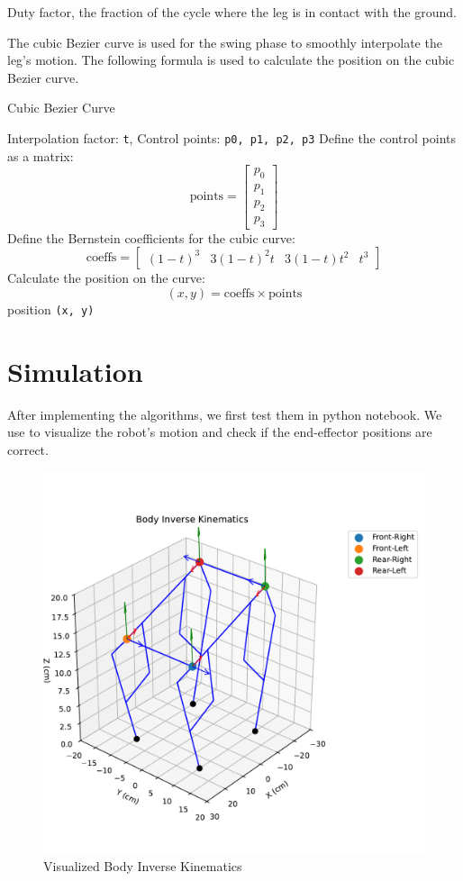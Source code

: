 \documentclass[a4paper,11pt]{article}
\begin{document}
Duty factor, the fraction of the cycle where the leg is in contact with the ground.

The cubic Bezier curve is used for the swing phase to smoothly interpolate the leg's motion. The following formula is used to calculate the position on the cubic Bezier curve.

\begin{algorithm}[H]
	\caption{Cubic Bezier Curve}
	\begin{algorithmic}[1]
		\Require Interpolation factor: \texttt{t}, Control points: \texttt{p0, p1, p2, p3}
		\State Define the control points as a matrix:
		$$
			\text{points} = \begin{bmatrix} p_0 \\ p_1 \\ p_2 \\ p_3 \end{bmatrix}
		$$
		\State Define the Bernstein coefficients for the cubic curve:
		$$
			\text{coeffs} = \begin{bmatrix} (1-t)^3 & 3(1-t)^2t & 3(1-t)t^2 & t^3 \end{bmatrix}
		$$
		\State Calculate the position on the curve:
		$$
			(x, y) = \text{coeffs} \times \text{points}
		$$
		\State \Return position \texttt{(x, y)}
	\end{algorithmic}
\end{algorithm}

\section{Simulation}

After implementing the algorithms, we first test them in python notebook.
We use  to visualize the robot's motion and check if the end-effector positions are correct.

\begin{figure}[H]
  \centering
	\includegraphics[width=0.55\linewidth]{../../assets/body_inverse_kinematics.pdf}
  \caption{Visualized Body Inverse Kinematics}
  \label{fig:body}
\end{figure}
\end{document}
